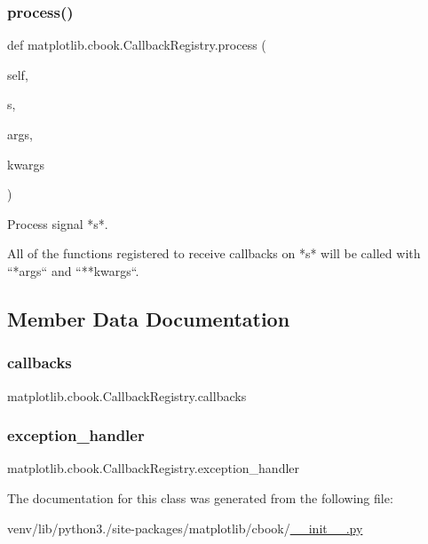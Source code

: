\subsubsection{\texorpdfstring{process()}{process()}}
{\footnotesize\ttfamily def matplotlib.\+cbook.\+Callback\+Registry.\+process (\begin{DoxyParamCaption}\item[{}]{self,  }\item[{}]{s,  }\item[{}]{args,  }\item[{}]{kwargs }\end{DoxyParamCaption})}

\begin{DoxyVerb}Process signal *s*.

All of the functions registered to receive callbacks on *s* will be
called with ``*args`` and ``**kwargs``.
\end{DoxyVerb}
 

\subsection{Member Data Documentation}
\mbox{\label{classmatplotlib_1_1cbook_1_1CallbackRegistry_a9ea234f5259f5647b3a9b0a9c04770e3}} 
\subsubsection{\texorpdfstring{callbacks}{callbacks}}
{\footnotesize\ttfamily matplotlib.\+cbook.\+Callback\+Registry.\+callbacks}

\mbox{\label{classmatplotlib_1_1cbook_1_1CallbackRegistry_a2c68ab86f7ec16b687844de1ad5ce879}} 
\subsubsection{\texorpdfstring{exception\+\_\+handler}{exception\_handler}}
{\footnotesize\ttfamily matplotlib.\+cbook.\+Callback\+Registry.\+exception\+\_\+handler}



The documentation for this class was generated from the following file\+:\begin{DoxyCompactItemize}
\item 
venv/lib/python3./site-\/packages/matplotlib/cbook/\hyperlink{venv_2lib_2python3_89_2site-packages_2matplotlib_2cbook_2____init_____8py}{\+\_\+\+\_\+init\+\_\+\+\_\+.\+py}\end{DoxyCompactItemize}
